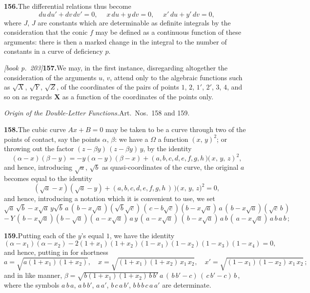 \documentclass[11pt,a4paper]{article}
\begin{document}
\medskip\noindent\textbf{156.}\quad The differential relations thus become
\[
du\,du' + dv\,dv' = 0,\;\quad x\,du + y\,dv = 0,\;\quad x'\,du + y'\,dv = 0,
\]
where $J$, $J$ are constants which are determinable as definite integrals by the consideration that the conic $f$ may be defined as a continuous function of these arguments: there is then a marked change in the integral to the number of constants in a curve of deficiency $p$.

\medskip\noindent\textit{[book p.~203]}\quad \textbf{157.}\quad We may, in the first instance, disregarding altogether the consideration of the arguments $u$, $v$, attend only to the algebraic functions such as $\sqrt{X}$, $\sqrt{Y}$, $\sqrt{Z}$, of the coordinates of the pairs of points $1$, $2$, $1'$, $2'$, $3$, $4$, and so on as regards $\bm{X}$ as a function of the coordinates of the points only.

\medskip\noindent\textit{Origin of the Double-Letter Functions.}\quad Art.\ Nos.\ 158 and 159.

\medskip\noindent\textbf{158.}\quad The cubic curve $Ax + B = 0$ may be taken to be a curve through two of the points of contact, say the points $\alpha$, $\beta$: we have a $\Omega$ a function $(x,\,y)^2$; or throwing out the factor $(z - \beta y)\,(z - \beta y)\,y$, by the identity
\[
(\alpha - x)(\beta - y) = -y(\alpha - y)(\beta - x) + (a, b, c, d, e, f, g, h\!\,\mbox{$)\!($}\,x,\,y,\,z)^2,
\]
and hence, introducing $\sqrt{a}$, $\sqrt{b}$ as quasi-coordinates of the curve, the original $a$ becomes equal to the identity
\[
(\sqrt{a} - x)(\sqrt{a} - y) + (a, b, c, d, e, f, g, h\,)\!\,\mbox{$)\!($}\,x,\,y,\,z)^2 = 0,
\]
and hence, introducing a notation which it is convenient to use, we set
\[
\sqrt{a}\,\sqrt{b} - x\sqrt{a}\,y\sqrt{b}\,a\,(\,b - x\sqrt{a})(\sqrt{b}\sqrt{c})\,(\,c - b\sqrt{c})(b - x\sqrt{a})\,a\,(\,b - x\sqrt{a})(\sqrt{c}\,b\,)
\]
\[
- \,Y\,(\,b - x\sqrt{a})(b - \sqrt{a})(\,a - x\sqrt{a})\,a\,y\,(\,a - x\sqrt{a})\,(\,b - x\sqrt{a})\,a\,b\,(\,a - x\sqrt{a})\,a\,b\,a\,b\,;
\]

\medskip\noindent\textbf{159.}\quad Putting each of the $y$'s equal $1$, we have the identity
\[
(\alpha - x_1)(\alpha - x_2) - 2(1 + x_1)(1 + x_2)(1 - x_1)(1 - x_2)(1 - x_3)(1 - x_4) = 0,
\]
and hence, putting in for shortness
\[
a = \sqrt{a(1 + x_1)(1 + x_2)},\quad x = \sqrt{(1 + x_1)(1 + x_2)\,x_1\,x_2},\quad x' = \sqrt{(1 - x_1)(1 - x_2)\,x_1\,x_2}\,;
\]
and in like manner, $\beta = \sqrt{b(1 + x_1)(1 + x_2)\,b\,b'}\,a\,(\,b\,b' - c)\,(\,c\,b' - c)\,b\,$, where the symbols $a\,b\,a$, $a\,b\,b'$, $a\,a'$, $b\,c\,a\,b'$, $b\,b\,b\,c\,a\,a'$ are determinate.
\end{document}
